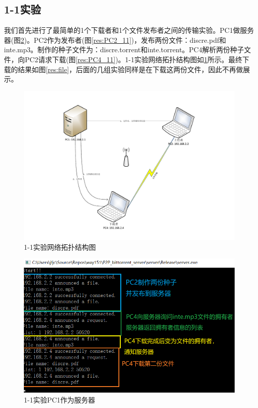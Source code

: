 \documentclass[thesis]{thesis}
\begin{document}
	\subsection{1-1实验}
	我们首先进行了最简单的1个下载者和1个文件发布者之间的传输实验。PC1做服务器(图\ref{res:PC1_11})。PC2作为发布者(图\ref{res:PC2_11})，发布两份文件：discre.pdf和inte.mp3。制作的种子文件为：discre.torrent和inte.torrent。PC4解析两份种子文件，向PC2请求下载(图\ref{res:PC4_11})。1-1实验网络拓扑结构图如\ref{res:11}所示。最终下载的结果如图\ref{res:file}，后面的几组实验同样是在下载这两份文件，因此不再做展示。

	\begin{figure}[H]
		\centering
		\includegraphics[width=0.6\linewidth]{fig/1-1.pdf}
		\caption{1-1实验\quad 网络拓扑结构图}
		\label{res:11}
	\end{figure}
	\begin{figure}[H]
		\centering
		\includegraphics[width=0.6\linewidth]{fig/PC1_11.png}
		\caption{1-1实验\quad PC1作为服务器}
		\label{res:PC1_11}
	\end{figure}
\end{document}
